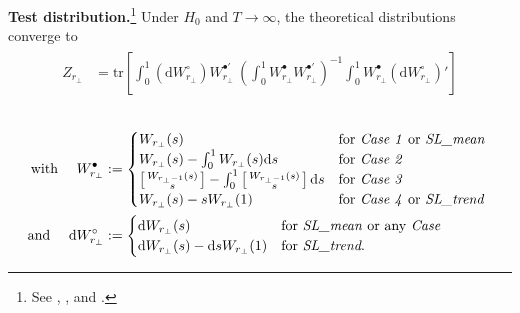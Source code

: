 \textbf{Test distribution.}\footnote{See \citet[Ch.~11.2]{Johansen1996}, \citet[Ch.~8.2]{Lutkepohl2005}, and \citet[p.~24, Eq.~2.9]{Trenkler2008}.} Under $ H_0 $ and $ T \to \infty $, the theoretical distributions converge to
\begin{align} \label{eq:asympDistr}
\begin{split}
	Z_{r_\perp} & = \text{tr} \left[ \int_0^1 \left(\text{d} W^\circ_{r_\perp} \right) W_{r_\perp}^{\bullet'} \ \left( \int_0^1 W^\bullet_{r_\perp} W_{r_\perp}^{\bullet'} \right)^{-1} \int_0^1 W^\bullet_{r_\perp} \left(\text{d} W^\circ_{r_\perp}\right)' \right]
\end{split}
\end{align}\\[-27pt]
\begin{align} \label{eq:asympDistr2}
\begin{split}
	\text{with \quad} W^\bullet_{r_\perp} & := 
	\begin{cases}
	W_{r_\perp} {\left( s \right)} & \text{for \textit{Case 1} or \textit{SL\_mean} } \\
	W_{r_\perp} {\left( s \right)} - \int_0^1 W_{r_\perp}{\left( s \right)}\text{d} s & \text{for \textit{Case 2} } \\
	\left[ \begin{smallmatrix}
	W_{r_\perp-1} {\left( s \right)} \\ s
	\end{smallmatrix} \right] - \int_0^1 \left[ \begin{smallmatrix}
	W_{r_\perp-1} {\left( s \right)} \\ s
	\end{smallmatrix} \right] \text{d} s & \text{for \textit{Case 3} } \\
	W_{r_\perp} {\left( s \right)} - sW_{r_\perp}{\left( 1 \right)} & \text{for \textit{Case 4} or \textit{SL\_trend}} \\
	\end{cases} \\
	\text{and \quad} \text{d} W^\circ_{r_\perp} & := 
	\begin{cases}
	\text{d} W_{r_\perp} {\left( s \right)} & \text{for \textit{SL\_mean} or any \textit{Case}} \\
	\text{d} W_{r_\perp} {\left( s \right)} - \text{d} sW_{r_\perp}{\left( 1 \right)} & \text{for \textit{SL\_trend}.} \\
\end{cases}
\end{split}
\end{align}
